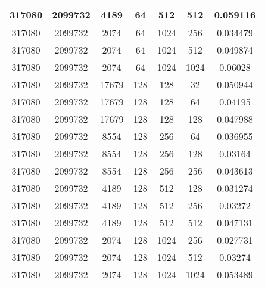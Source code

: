 \documentclass[9pt]{article}
\begin{document}
\begin{tabular}{|c|c|c|c|c|c|c| }
317080  & 2099732  & 4189  & 64  & 512  & 512  & 0.059116 \\
\hline
317080  & 2099732  & 2074  & 64  & 1024  & 256  & 0.034479 \\
\hline
317080  & 2099732  & 2074  & 64  & 1024  & 512  & 0.049874 \\
\hline
317080  & 2099732  & 2074  & 64  & 1024  & 1024  & 0.06028 \\
\hline
317080  & 2099732  & 17679  & 128  & 128  & 32  & 0.050944 \\
\hline
317080  & 2099732  & 17679  & 128  & 128  & 64  & 0.04195 \\
\hline
317080  & 2099732  & 17679  & 128  & 128  & 128  & 0.047988 \\
\hline
317080  & 2099732  & 8554  & 128  & 256  & 64  & 0.036955 \\
\hline
317080  & 2099732  & 8554  & 128  & 256  & 128  & 0.03164 \\
\hline
317080  & 2099732  & 8554  & 128  & 256  & 256  & 0.043613 \\
\hline
317080  & 2099732  & 4189  & 128  & 512  & 128  & 0.031274 \\
\hline
317080  & 2099732  & 4189  & 128  & 512  & 256  & 0.03272 \\
\hline
317080  & 2099732  & 4189  & 128  & 512  & 512  & 0.047131 \\
\hline
317080  & 2099732  & 2074  & 128  & 1024  & 256  & 0.027731 \\
\hline
317080  & 2099732  & 2074  & 128  & 1024  & 512  & 0.03274 \\
\hline
317080  & 2099732  & 2074  & 128  & 1024  & 1024  & 0.053489 \\
\hline
\end{tabular}
 
\end{document}
